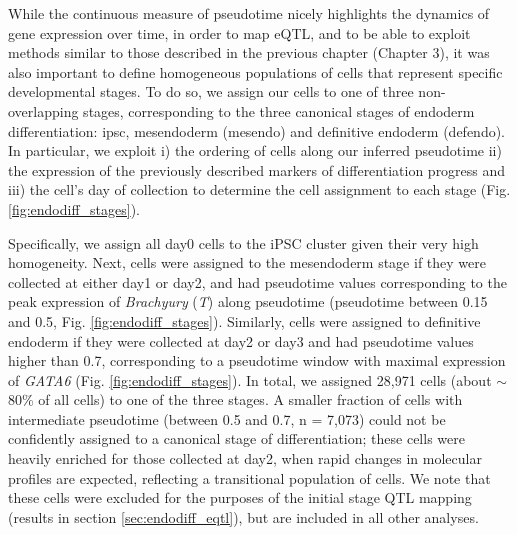 While the continuous measure of pseudotime nicely highlights the dynamics of gene expression over time, in order to map eQTL, and to be able to exploit methods similar to those described in the previous chapter (Chapter 
3), it was also important to define homogeneous populations of cells that represent specific developmental stages.
To do so, we assign our cells to one of three non-overlapping stages, corresponding to the three canonical stages of endoderm differentiation: \gls{ipsc}, mesendoderm (mesendo) and definitive endoderm (defendo).
In particular, we exploit i) the ordering of cells along our inferred pseudotime ii) the expression of the previously described markers of differentiation progress and iii) the cell's day of collection to determine the cell assignment to each stage (Fig. \ref{fig:endodiff_stages}).

Specifically, we assign all day0 cells to the iPSC cluster given their very high homogeneity.
Next, cells were assigned to the mesendoderm stage if they were collected at either day1 or day2, and had pseudotime values corresponding to the peak expression of \textit{Brachyury} (\textit{T}) along pseudotime (pseudotime between 0.15 and 0.5, Fig. \ref{fig:endodiff_stages}).  
Similarly, cells were assigned to definitive endoderm if they were collected at day2 or day3 and had pseudotime values higher than 0.7, corresponding to a pseudotime window with maximal expression of \textit{GATA6} (Fig. \ref{fig:endodiff_stages}).
In total, we assigned 28,971 cells (about $\sim$80\% of all cells) to one of the three stages. 
A smaller fraction of cells with intermediate pseudotime (between 0.5 and 0.7, n = 7,073) could not be confidently assigned to a canonical stage of differentiation; these cells were heavily enriched for those collected at day2, when rapid changes in molecular profiles are expected, reflecting a transitional population of cells.
We note that these cells were excluded for the purposes of the initial stage QTL mapping (results in section \ref{sec:endodiff_eqtl}), but are included in all other analyses. 

\vspace{2mm}

